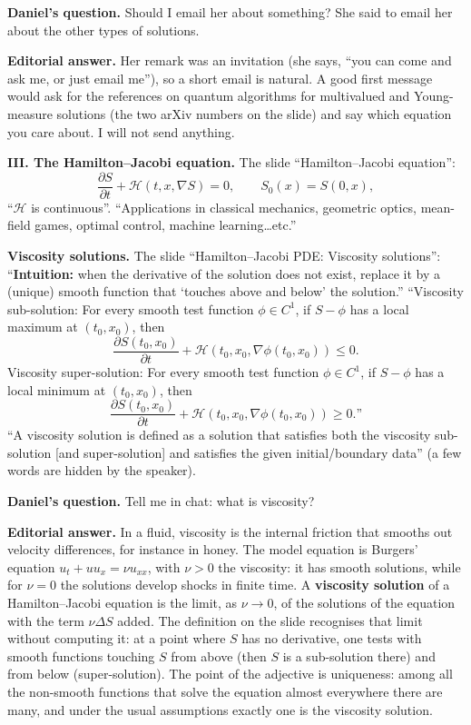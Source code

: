 \medskip\noindent
{\bf Daniel's question.}
Should I email her about something? She said
to email her about the other types of
solutions.

\medskip\noindent
{\bf Editorial answer.}
Her remark was an invitation (she says, ``you
can come and ask me, or just email me''), so a
short email is natural. A good first message would ask
for the references on quantum algorithms for
multivalued and Young-measure solutions (the
two arXiv numbers on the slide) and say which
equation you care about. I will not send
anything.

\medskip\noindent
{\bf III. The Hamilton--Jacobi equation.}
The slide ``Hamilton--Jacobi equation'':
$$
\frac{\partial S}{\partial t}
+\mathcal{H}(t,x,\nabla S)=0,
\qquad
S_0(x)=S(0,x),
$$
``$\mathcal{H}$ is continuous''. ``Applications
in classical mechanics, geometric optics,
mean-field games, optimal control, machine
learning\dots etc.''

\medskip\noindent
{\bf Viscosity solutions.}
The slide ``Hamilton--Jacobi PDE: Viscosity
solutions'': ``{\bf Intuition:} when the
derivative of the solution does not exist,
replace it by a (unique) smooth function that
`touches above and below' the solution.''
``Viscosity sub-solution: For every smooth test
function $\phi\in C^1$, if $S-\phi$ has a
local maximum at $(t_0,x_0)$, then
$$
\frac{\partial S(t_0,x_0)}{\partial t}
+\mathcal{H}(t_0,x_0,\nabla\phi(t_0,x_0))
\le0.
$$
Viscosity super-solution: For every smooth test
function $\phi\in C^1$, if $S-\phi$ has a
local minimum at $(t_0,x_0)$, then
$$
\frac{\partial S(t_0,x_0)}{\partial t}
+\mathcal{H}(t_0,x_0,\nabla\phi(t_0,x_0))
\ge0.\text{''}
$$
``A viscosity solution is defined as a
solution that satisfies both the viscosity
sub-solution [and super-solution] and
satisfies the given initial/boundary data''
(a few words are hidden by the speaker).

\medskip\noindent
{\bf Daniel's question.}
Tell me in chat: what is viscosity?

\medskip\noindent
{\bf Editorial answer.}
In a fluid, viscosity is the internal friction
that smooths out velocity differences, for
instance in honey. The model equation is
Burgers' equation
$u_t+uu_x=\nu u_{xx}$, with $\nu>0$ the
viscosity: it has smooth solutions, while for
$\nu=0$ the solutions develop shocks in finite
time. A {\bf viscosity solution} of
a Hamilton--Jacobi equation is the limit, as
$\nu\to0$, of the solutions of the equation
with the term $\nu\Delta S$ added. The
definition on the slide recognises that limit
without computing it: at a point where $S$
has no derivative, one tests with smooth
functions touching $S$ from above (then $S$
is a sub-solution there) and from below
(super-solution). The point of the
adjective is uniqueness: among all the
non-smooth functions that solve the equation
almost everywhere there are many, and under
the usual assumptions exactly one is the
viscosity solution.

